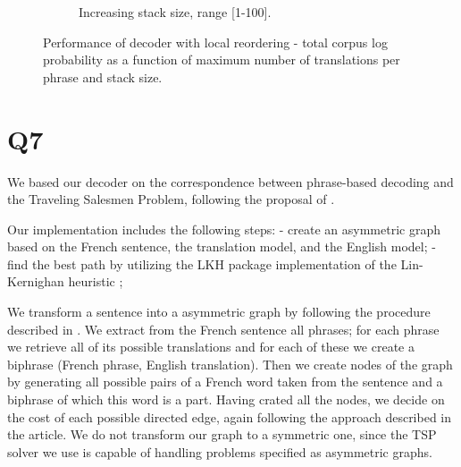 \documentclass[11pt]{article}
\begin{document}
\begin{figure}
\begin{subfigure}{.45\linewidth}
		\caption{Increasing stack size, range [1-100].}
	\end{subfigure}
	\caption{Performance of decoder with local reordering - total corpus log probability as a function of maximum number of translations per phrase and stack size.}
\end{figure}

\section*{Q7}
We based our decoder on the correspondence between phrase-based decoding and the Traveling Salesmen Problem, following the proposal of \cite{zaslavskiy2009}.

Our implementation includes the following steps:
- create an asymmetric graph based on the French sentence, the translation model, and the English model;
- find the best path by utilizing the LKH package implementation of the Lin-Kernighan heuristic \cite{Helsgaun2006};

We transform a sentence into a asymmetric graph by following the procedure described in \cite{zaslavskiy2009}. We extract from the French sentence all phrases; for each phrase we retrieve all of its possible translations and for each of these we create a biphrase (French phrase, English translation). Then we create nodes of the graph by generating all possible pairs of a French word taken from the sentence and a biphrase of which this word is a part. Having crated all the nodes, we decide on the cost of each possible directed edge, again following the approach described in the article. We do not transform our graph to a symmetric one, since the TSP solver we use is capable of handling problems specified as asymmetric graphs.






\end{document}
